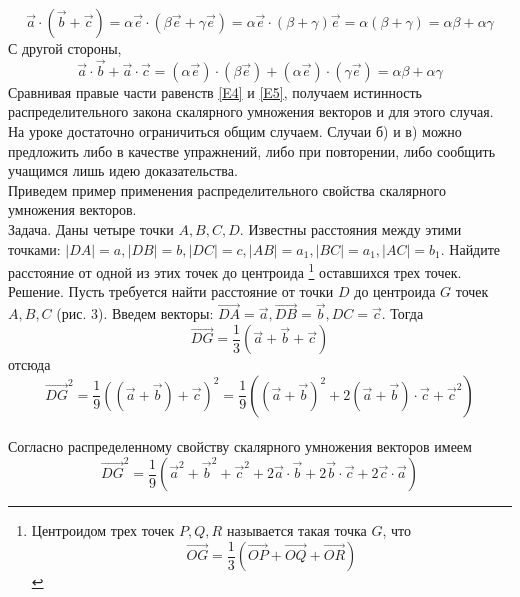 \documentclass{article}
\begin{document}
\begin{equation}\label{E4}
\overrightarrow{a}\cdot(\overrightarrow{b}+\overrightarrow{c})=\alpha\overrightarrow{e}\cdot(\beta\overrightarrow{e}+\gamma\overrightarrow{e})=\alpha\overrightarrow{e}\cdot(\beta+\gamma)\overrightarrow{e}=\alpha(\beta+\gamma)=\alpha\beta+\alpha\gamma
\end{equation}
С другой стороны,
\begin{equation}\label{E5}
\overrightarrow{a}\cdot\overrightarrow{b}+\overrightarrow{a}\cdot\overrightarrow{c}=(\alpha\overrightarrow{e})\cdot(\beta\overrightarrow{e})+(\alpha\overrightarrow{e})\cdot(\gamma\overrightarrow{e})=\alpha\beta+\alpha\gamma
\end{equation}
Сравнивая правые части равенств \eqref{E4} и \eqref{E5}, получаем истинность распределительного закона скалярного умножения векторов и для этого случая.
\\На уроке достаточно ограничиться общим случаем. Случаи б) и в) можно предложить либо в качестве упражнений, либо при повторении, либо сообщить учащимся лишь идею доказательства.
\\Приведем пример применения распределительного свойства скалярного умножения векторов.
\\Задача. Даны четыре точки $A,B,C,D$. Известны расстояния между этими точками: $|DA|=a,|DB|=b,|DC|=c,|AB|=a_1,|BC|=a_1,|AC|=b_1$. Найдите расстояние от одной из этих точек до центроида \footnote[1]{Центроидом трех точек $P,Q,R$ называется такая точка $G$, что $$\overrightarrow{OG}=\frac{1}{3}(\overrightarrow{OP}+\overrightarrow{OQ}+\overrightarrow{OR})$$} оставшихся трех точек.
\\Решение. Пусть требуется найти расстояние от точки $D$ до центроида $G$ точек $A,B,C$ (рис. 3). Введем векторы: $\overrightarrow{DA}=\overrightarrow{a},\overrightarrow{DB}=\overrightarrow{b},DC=\overrightarrow{c}$. Тогда
$$\overrightarrow{DG}=\frac{1}{3}(\overrightarrow{a}+\overrightarrow{b}+\overrightarrow{c})$$
отсюда 
$$\overrightarrow{DG}^2=\frac{1}{9}((\overrightarrow{a}+\overrightarrow{b})+\overrightarrow{c})^2=\frac{1}{9}((\overrightarrow{a}+\overrightarrow{b})^2+2(\overrightarrow{a}+\overrightarrow{b})\cdot\overrightarrow{c}+\overrightarrow{c}^2)$$
\\Согласно распределенному свойству скалярного умножения векторов имеем 
$$\overrightarrow{DG}^2=\frac{1}{9}(\overrightarrow{a}^2+\overrightarrow{b}^2+\overrightarrow{c}^2+2\overrightarrow{a}\cdot\overrightarrow{b}+2\overrightarrow{b}\cdot\overrightarrow{c}+2\overrightarrow{c}\cdot\overrightarrow{a})$$
\end{document}
